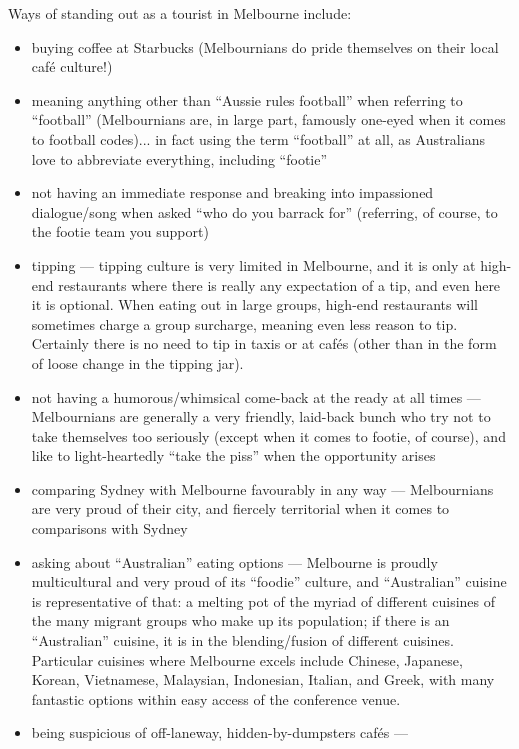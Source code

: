Ways of standing out as a tourist in Melbourne include:
\begin{itemize}
\item buying coffee at Starbucks (Melbournians do pride themselves on
  their local caf\'e culture!)
\item meaning anything other than ``Aussie rules football'' when
  referring to ``football'' (Melbournians are, in large part, famously
  one-eyed when it comes to football codes)... in fact using the term
  ``football'' at all, as Australians love to abbreviate everything,
  including ``footie''
\item not having an immediate response and breaking into impassioned
  dialogue/song when asked ``who do you barrack for'' (referring, of
  course, to the footie team you support)
\item tipping --- tipping culture is very limited in Melbourne, and it
  is only at high-end restaurants where there is really any expectation
  of a tip, and even here it is optional. When eating out in large
  groups, high-end restaurants will sometimes charge a group surcharge,
  meaning even less reason to tip. Certainly there is no need to tip in
  taxis or at caf\'es (other than in the form of loose change in the
  tipping jar).
\item not having a humorous/whimsical come-back at the ready at all
  times --- Melbournians are generally a very friendly, laid-back bunch
  who try not to take themselves too seriously (except when it comes to
  footie, of course), and like to light-heartedly ``take the piss'' when
  the opportunity arises
\item comparing Sydney with Melbourne favourably in any way ---
  Melbournians are very proud of their city, and fiercely territorial
  when it comes to comparisons with Sydney
\item asking about ``Australian'' eating options --- Melbourne is
  proudly multicultural and very proud of its ``foodie'' culture, and
  ``Australian'' cuisine is representative of that: a melting pot of the
  myriad of different cuisines of the many migrant groups who make up
  its population; if there is an ``Australian'' cuisine, it is in the
  blending/fusion of different cuisines. Particular cuisines where
  Melbourne excels include Chinese, Japanese, Korean, Vietnamese,
  Malaysian, Indonesian, Italian, and Greek, with many fantastic options
  within easy access of the conference venue.
\item being suspicious of off-laneway, hidden-by-dumpsters caf\'es ---

\end{itemize}
